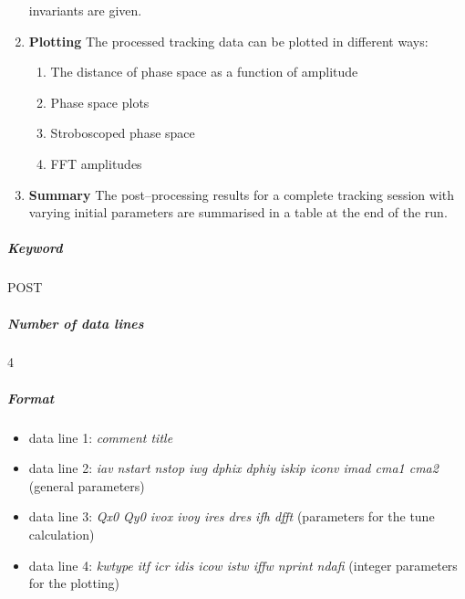 \begin{enumerate}
  invariants are given.
\item {\bf Plotting} The processed tracking data can be plotted in
  different ways:
 \begin{enumerate}
 \item The distance of phase space as a function of amplitude
 \item Phase space plots
 \item Stroboscoped phase space
 \item FFT amplitudes
 \end{enumerate}
\item {\bf Summary} The post--processing results for a complete
  tracking session with varying initial parameters are summarised in a
  table at the end of the run.
\end{enumerate}

\subparagraph{Keyword} POST \subparagraph{Number of data lines} 4

\subparagraph{Format}
\begin{itemize}
\item data line 1: {\em comment title}
\item data line 2: {\em iav nstart nstop iwg dphix dphiy iskip iconv
    imad cma1 cma2} \/(general parameters)
\item data line 3: {\em Qx0 Qy0 ivox ivoy ires dres ifh dfft}
  \/(parameters for the tune calculation)
\item data line 4: {\em kwtype itf icr idis icow istw iffw nprint
    ndafi} \/(integer parameters for the plotting)
\end{itemize}


